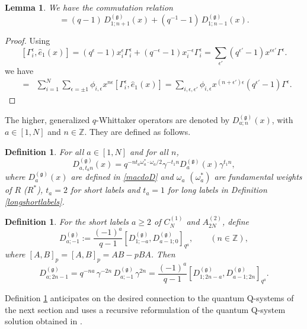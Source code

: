 \documentclass[12pt]{amsart}
\newtheorem{defn}[thm]{Definition}
\newtheorem{lemma}[thm]{Lemma}
\newcommand{\g}{{\mathfrak{g}}}
\newcommand{\Z}{{\mathbb Z}}
\numberwithin{equation}{section}
\begin{document}
\begin{lemma}\label{comuonelem}
We have the commutation relation
%
%
%
%
\begin{equation}
[D_{1;n}^{(\g)}(x),{\hat e}_1(x)]=(q-1) \, D_{1;n+1}^{(\g)}(x)+(q^{-1}-1)\, D_{1;n-1}^{(\g)}(x)\label{Gid}.
\end{equation}
\end{lemma}
\begin{proof}
Using
$$[\Gamma_i^\epsilon,\hat e_1(x)]  = (q^{\epsilon}-1)x_i^\epsilon\Gamma_i^\epsilon + (q^{-\epsilon}-1)x_i^{-\epsilon}\Gamma_i^\epsilon  = \sum_{\epsilon'} (q^{\epsilon'}-1)x^{\epsilon \epsilon'}\Gamma^\epsilon.$$ 
we have
\begin{eqnarray*}
[D_{1,n}^{(\g)}, e_1^{(x)}]&=& \sum_{i=1}^N\sum_{\epsilon=\pm1} \phi_{i,\epsilon} x^{n \epsilon} [\Gamma_i^\epsilon,\hat e_1(x)] 
= \sum_{i,\epsilon,\epsilon'} \phi_{i,\epsilon} x^{(n+\epsilon')\epsilon}(q^{\epsilon'}-1)\Gamma^\epsilon.
\end{eqnarray*}
%
%
%
%
%
%
%
%
%
%
%
%
%
%
%
%
%
%
%
%
%
%
%
%
%
%
\end{proof}


%
%
%
%
%
%
%
%
%
The higher, generalized $q$-Whittaker operators are denoted by $D_{a;n}^{(\g)}(x)$, with $a\in[1,N]$ and $n\in \Z$. 
%
They are defined as follows.
%
\begin{defn}\label{moredefn} 
For all $a\in[1,N]$ and for all $n$,
$$
D_{a,t_a n}^{(\g)}(x) = q^{-nt_a\omega^*_a\cdot \omega_a/2} \gamma^{-t_1 n} D_{a}^{(\g)}(x) \gamma^{t_1 n},
$$
where $D_a^{(\g)}(x)$ are defined in \eqref{macdoD} and $\omega_a$ $(\omega_a^*) $ are fundamental weights of $R$ ($R^*$), $t_a=2$ for short labels and $t_a=1$ for long labels  in Definition \ref{longshortlabels}.

%
%
%
%
%
%
%
%
%
%
%
%
%
%
%
%
%
%
%
\end{defn}

%
%
\begin{defn}\label{cadefs}
For the short labels $a\geq 2$ of $C_N^{(1)}$ and $A_{2N}^{(2)}$, define
\begin{equation}\label{oddshortn}
D_{a;-1}^{(\g)}:=\frac{(-1)^a}{q-1}[D_{1;-a}^{(\g)},D_{a-1;0}^{(\g)}]_{q^a},\qquad (n\in \Z),
\end{equation}
where $[A,B]_p= [A,B]_p=AB-p BA$. Then
$$D_{a;2n-1}^{(\g)}=q^{-n a}\, \gamma^{-2n}\, D_{a;-1}^{(\g)}\, \gamma^{2n} = \frac{(-1)^a}{q-1}[D_{1;2n-a}^{(\g)},D_{a-1;2n}^{(\g)}]_{q^a}.
$$
\end{defn}
Definition \ref{cadefs} anticipates on the desired connection to the quantum Q-systems of the next section and uses a recursive reformulation of the quantum Q-system solution obtained in \cite{DFK16}. 
\end{document}
